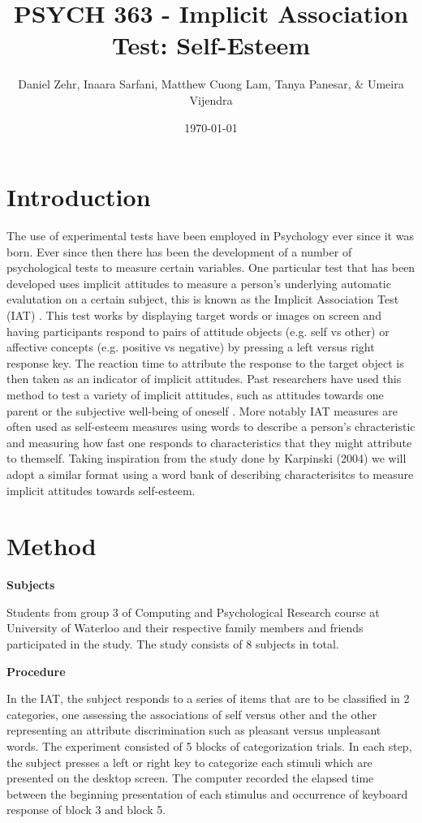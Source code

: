 \documentclass[11pt]{article}
\author{Daniel Zehr, Inaara Sarfani, Matthew Cuong Lam, Tanya Panesar, \& Umeira Vijendra}
\date{\today}
\title{PSYCH 363 - Implicit Association Test: Self-Esteem}
\begin{document}
\maketitle
\tableofcontents




\section{Introduction}
\label{sec:org0588127}


The use of experimental tests have been employed in Psychology ever since it was born. Ever since then there has been the development of a number of psychological tests to measure certain variables. One particular test that has been developed uses implicit attitudes to measure a person's underlying automatic evalutation on a certain subject, this is known as the Implicit Association Test (IAT) \cite{greenwald_mcghee_schwartz_1998}. This test works by displaying target words or images on screen and having participants respond to pairs of attitude objects (e.g. self vs other) or affective concepts (e.g. positive vs negative) by pressing a left versus right response key. The reaction time to attribute the response to the target object is then taken as an indicator of implicit attitudes. Past researchers have used this method to test a variety of implicit attitudes, such as attitudes towards one parent \cite{Yang_2013} or the subjective well-being of oneself \cite{Walker_Schimmack_2008}. More notably IAT measures are often used as self-esteem measures using words to describe a person's chracteristic and measuring how fast one responds to characteristics that they might attribute to themself. Taking inspiration from the study done by Karpinski (2004) we will adopt a similar format using a word bank of describing characterisitcs to measure implicit attitudes towards self-esteem. 

\section{Method}
\label{sec:org6c47a12}

\textbf{Subjects}

Students from group 3 of Computing and Psychological Research course at University of Waterloo and their respective family members and friends participated in the study. The study consists of 8 subjects in total. 

\noindent
\textbf{Procedure}

In the IAT, the subject responds to a series of items that are to be classified in 2 categories, one assessing the associations of self versus other and the other representing an attribute discrimination such as pleasant versus unpleasant words. The experiment consisted of 5 blocks of categorization trials. In each step, the subject presses a left or right key to categorize each stimuli which are presented on the desktop screen. The computer recorded the elapsed time between the beginning presentation of each stimulus and occurrence of keyboard response of block 3 and block 5.
\end{document}
